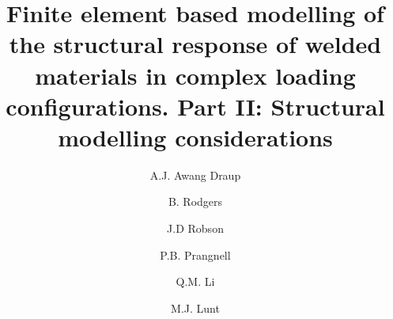 \begin{frontmatter}
\title{Finite element based modelling of the structural response of welded materials in complex loading configurations. %
Part II: Structural modelling considerations}
\author[1]{A.J. Awang Draup }
\author[1]{B. Rodgers}
\author[1]{J.D Robson}
\author[1]{P.B. Prangnell}
\author[1]{Q.M. Li}
\address[1]{The University of Manchester, Manchester, M13 9PL, UK}
\author[2]{M.J. Lunt}
\address[2]{DSTL, Porton, SP4 0JQ, UK}


\end{frontmatter}
